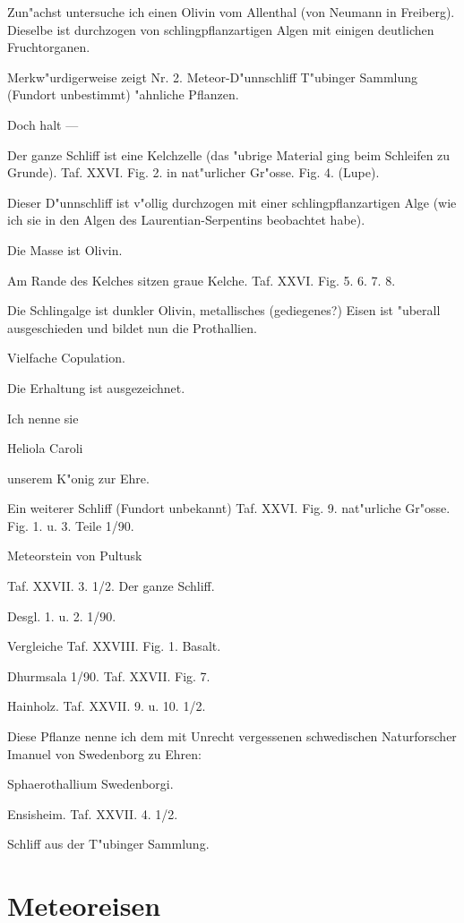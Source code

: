 \documentclass[a4paper, 11pt, oneside, german]{article}
\begin{document}
Zun"achst untersuche ich einen Olivin vom Allenthal (von Neumann in Freiberg). Dieselbe ist durchzogen von schlingpflanzartigen Algen mit einigen deutlichen Fruchtorganen.

Merkw"urdigerweise zeigt Nr. 2. Meteor-D"unnschliff T"ubinger Sammlung (Fundort unbestimmt) "ahnliche Pflanzen.

Doch halt ---

Der ganze Schliff ist eine Kelchzelle (das "ubrige Material ging beim Schleifen zu Grunde). Taf. XXVI. Fig. 2. in nat"urlicher Gr"osse. Fig. 4. (Lupe).

Dieser D"unnschliff ist v"ollig durchzogen mit einer schlingpflanzartigen Alge (wie ich sie in den Algen des Laurentian-Serpentins beobachtet habe).

Die Masse ist Olivin.

Am Rande des Kelches sitzen graue Kelche. Taf. XXVI. Fig. 5. 6. 7. 8.

Die Schlingalge ist dunkler Olivin, metallisches (gediegenes?) Eisen ist "uberall ausgeschieden und bildet nun die Prothallien.

Vielfache Copulation.

Die Erhaltung ist ausgezeichnet.

Ich nenne sie

Heliola Caroli

unserem K"onig zur Ehre.

    Ein weiterer Schliff (Fundort unbekannt) Taf. XXVI. Fig. 9. nat"urliche Gr"osse. Fig. 1. u. 3. Teile 1/90.

    Meteorstein von Pultusk

Taf. XXVII. 3. 1/2. Der ganze Schliff.

    Desgl. 1. u. 2. 1/90.

Vergleiche Taf. XXVIII. Fig. 1. Basalt.

    Dhurmsala 1/90. Taf. XXVII. Fig. 7.

    Hainholz. Taf. XXVII. 9. u. 10. 1/2.

Diese Pflanze nenne ich dem mit Unrecht vergessenen schwedischen Naturforscher Imanuel von Swedenborg zu Ehren:

Sphaerothallium Swedenborgi.

    Ensisheim. Taf. XXVII. 4. 1/2.

    Schliff aus der T"ubinger Sammlung.
\clearpage
\section{Meteoreisen}
\end{document}

